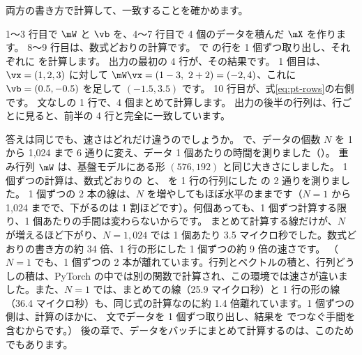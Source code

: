 両方の書き方で計算して、一致することを確かめます。

{\par}


1〜3 行目で $\mW$ と $\vb$ を、4〜7 行目で 4 個のデータを積んだ $\mX$ を作ります。
8〜9 行目は、数式どおりの計算です。
 で  の行を 1 個ずつ取り出し、それぞれに  を計算します。
出力の最初の 4 行が、その結果です。
1 個目は、$\vx=(1,2,3)$ に対して $\mW\vx=(1-3,\ 2+2)=(-2,4)$、これに $\vb=(0.5,-0.5)$ を足して $(-1.5,3.5)$ です。
10 行目が、式\eqref{eq:pt-rows}の右側です。 文なしの 1 行で、4 個まとめて計算します。
出力の後半の行列は、行ごとに見ると、前半の 4 行と完全に一致しています。

答えは同じでも、速さはどれだけ違うのでしょうか。
 で、データの個数 $N$ を 1 から 1,024 まで 6 通りに変え、データ 1 個あたりの時間を測りました（）。
重み行列 $\mW$ は、基盤モデルにある形 $(576,192)$ と同じ大きさにしました。
1 個ずつの計算は、数式どおりの  と、 を 1 行の行列にした  の 2 通りを測りました。
1 個ずつの 2 本の線は、$N$ を増やしてもほぼ水平のままです（$N=1$ から 1,024 までで、下がるのは 1 割ほどです）。何個あっても、1 個ずつ計算する限り、1 個あたりの手間は変わらないからです。
まとめて計算する線だけが、$N$ が増えるほど下がり、$N=1{,}024$ では 1 個あたり 3.5 マイクロ秒でした。数式どおりの書き方の約 34 倍、1 行の形にした 1 個ずつの約 9 倍の速さです。
（$N=1$ でも、1 個ずつの 2 本が離れています。行列とベクトルの積と、行列どうしの積は、PyTorch の中では別の関数で計算され、この環境では速さが違いました。また、$N=1$ では、まとめての線（25.9 マイクロ秒）と 1 行の形の線（36.4 マイクロ秒）も、同じ式の計算なのに約 1.4 倍離れています。1 個ずつの側は、計算のほかに、 文でデータを 1 個ずつ取り出し、結果を  でつなぐ手間を含むからです。）
後の章で、データをバッチにまとめて計算するのは、このためでもあります。

